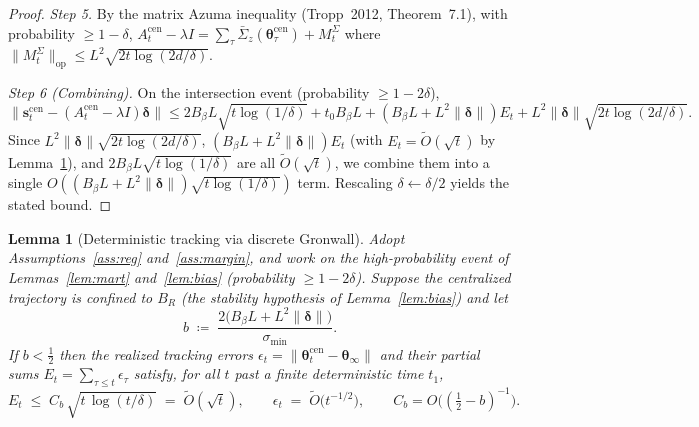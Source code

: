 \documentclass[11pt]{article}
\newtheorem{lemma}[theorem]{Lemma}
\begin{document}
\begin{proof}
\textit{Step 5.}  By the matrix Azuma inequality (Tropp~2012,
Theorem~7.1), with probability $\geq 1-\delta$,
$A_t^{\mathrm{cen}}-\lambda I=\sum_\tau\bar{\Sigma}_z(\bm{\theta}_\tau^{\mathrm{cen}})+M_t^\Sigma$
where $\|M_t^\Sigma\|_{\mathrm{op}}\leq L^2\sqrt{2t\log(2d/\delta)}$.

\textit{Step 6 (Combining).}  On the intersection event
(probability $\geq 1-2\delta$),
\[
\|\bm{s}_t^{\mathrm{cen}}-(A_t^{\mathrm{cen}}-\lambda I)\bm{\delta}\|
\leq 2B_\beta L\sqrt{t\log(1/\delta)}+t_0 B_\beta L
+(B_\beta L+L^2\|\bm{\delta}\|)E_t
+L^2\|\bm{\delta}\|\sqrt{2t\log(2d/\delta)}.
\]
Since $L^2\|\bm{\delta}\|\sqrt{2t\log(2d/\delta)}$,
$(B_\beta L+L^2\|\bm{\delta}\|)E_t$ (with $E_t=\widetilde O(\sqrt t)$ by
Lemma~\ref{lem:tracking}), and
$2B_\beta L\sqrt{t\log(1/\delta)}$ are all $\widetilde O(\sqrt{t})$,
we combine them into a single $O((B_\beta L+L^2\|\bm{\delta}\|)\sqrt{t\log(1/\delta)})$ term.
Rescaling $\delta\leftarrow\delta/2$ yields the stated
bound.
\end{proof}

\begin{lemma}[Deterministic tracking via discrete Gronwall]\label{lem:tracking}
Adopt Assumptions~\ref{ass:reg} and~\ref{ass:margin}, and work on the
high-probability event of Lemmas~\ref{lem:mart} and~\ref{lem:bias}
(probability $\geq 1-2\delta$).  Suppose the centralized trajectory is
confined to $B_R$ (the stability hypothesis of Lemma~\ref{lem:bias}) and
let
\begin{equation}
b\;\coloneqq\;\frac{2\bigl(B_\beta L+L^2\|\bm{\delta}\|\bigr)}{\sigma_{\min}}.
\label{eq:bconst}
\end{equation}
If $b<\tfrac12$ then the realized tracking errors
$\epsilon_t=\|\bm{\theta}_t^{\mathrm{cen}}-\bm{\theta}_\infty\|$ and their
partial sums $E_t=\sum_{\tau\leq t}\epsilon_\tau$ satisfy, for all $t$
past a finite deterministic time $t_1$,
\[
E_t\;\leq\;C_b\,\sqrt{t\,\log(t/\delta)}\;=\;\widetilde O(\sqrt t),
\qquad
\epsilon_t\;=\;\widetilde O\!\bigl(t^{-1/2}\bigr),
\qquad C_b=O\!\bigl((\tfrac12-b)^{-1}\bigr).
\]
\end{lemma}
\end{document}
